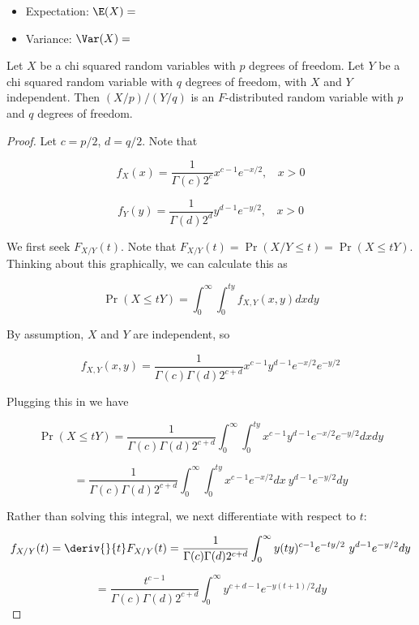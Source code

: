 \begin{itemize}
\begin{itemize}
\item Expectation: \(\E(X) = \)

\item Variance: \(\Var(X) = \)

\end{itemize}

\begin{proposition} Let $X$ be a chi squared random variables with $p$ degrees of freedom. Let $Y$ be a chi squared random variable with $q$ degrees of freedom, with $X$ and $Y$ independent. Then $(X/p)/(Y/q)$ is an \(F\)-distributed random variable with $p$ and $q$ degrees of freedom. \end{proposition}

\begin{proof}

Let \(c = p/2\), \(d = q/2\). Note that

\[
f_X(x) = \frac{1}{\Gamma(c)2^c}x^{c-1}e^{-x/2}, \ \ \ \ x > 0
\]

\[
f_Y(y) = \frac{1}{\Gamma(d)2^d}y^{d-1}e^{-y/2}, \ \ \ \ x > 0
\]

We first seek \(F_{X/Y}(t)\). Note that \( F_{X/Y}(t) = \Pr(X/Y \leq t) = \Pr(X \leq tY)\). Thinking about this graphically, we can calculate this as

\[
 \Pr(X \leq tY) = \int_0^\infty \int_0^{ty}  f_{X,Y}(x,y)    dx dy
\]

By assumption, \(X\) and \(Y\) are independent, so

\[
f_{X,Y}(x,y) = \frac{1}{\Gamma(c)\Gamma(d)2^{c+d}}x^{c-1}y^{d-1}e^{-x/2}e^{-y/2}
\]

Plugging this in we have

\[
 \Pr(X \leq tY) =   \frac{1}{\Gamma(c)\Gamma(d)2^{c+d}} \int_0^\infty \int_0^{ty}x^{c-1}y^{d-1}e^{-x/2}e^{-y/2}   dx dy
\]

\[
=   \frac{1}{\Gamma(c)\Gamma(d)2^{c+d}} \int_0^\infty \int_0^{ty}x^{c-1}e^{-x/2}  dx  \ y^{d-1} e^{-y/2}  dy
\]

Rather than solving this integral, we next differentiate with respect to \(t\):

\[
f_{X/Y}(t) = \deriv{}{t} F_{X/Y}(t) =    \frac{1}{\Gamma(c)\Gamma(d)2^{c+d}} \int_0^\infty y (ty)^{c-1}e^{-ty/2}    \ y^{d-1} e^{-y/2} dy 
\]

\begin{equation}\label{prob.541a.hw3.9a}
=    \frac{t^{c-1}}{\Gamma(c)\Gamma(d)2^{c+d}} \int_0^\infty  y^{c+d-1} e^{-y(t+1)/2} dy 
\end{equation}


\end{proof}
\end{itemize}
